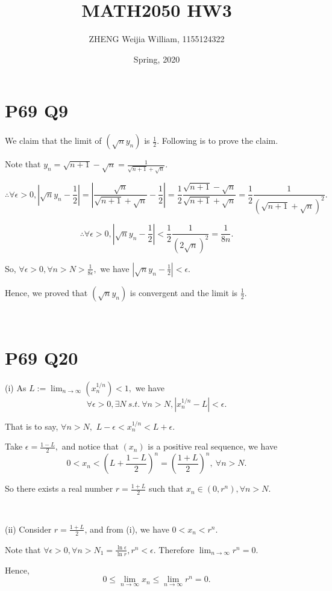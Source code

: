 \documentclass[12pt]{article}%
\begin{document}
\title{MATH2050 HW3}
\author{ZHENG Weijia William, 1155124322}
\date{Spring, 2020}
\maketitle

\section{P69 Q9}
We claim that the limit of $(\sqrt{n}y_n)$ is $\frac{1}{2}$. Following is to prove the claim. 

Note that $y_n=\sqrt{n+1}-\sqrt{n}=\frac{1}{\sqrt{n+1}+\sqrt{n}}.$

$$\therefore \forall \epsilon >0, |\sqrt{n}y_n-\frac{1}{2}|=|\frac{\sqrt{n}}{\sqrt{n+1}+\sqrt{n}}-\frac{1}{2}|=\frac{1}{2}\frac{\sqrt{n+1}-\sqrt{n}}{\sqrt{n+1}+\sqrt{n}}=\frac{1}{2}\frac{1}{(\sqrt{n+1}+\sqrt{n})^2}.$$

$$\therefore \forall \epsilon >0, |\sqrt{n}y_n-\frac{1}{2}|<\frac{1}{2}\frac{1}{(2\sqrt{n})^2}=\frac{1}{8n}.$$

So, $\forall \epsilon >0, \forall n>N>\frac{1}{8\epsilon},$ we have $|\sqrt{n}y_n-\frac{1}{2}|<\epsilon.$

Hence, we proved that $(\sqrt{n}y_n)$ is convergent and the limit is $\frac{1}{2}.$

~\

\section{P69 Q20}
(i) As $L:=\lim_{n \to \infty}(x_n^{1/n})<1,$ we have $$\forall \epsilon >0, \exists N~s.t.~\forall n>N, |x_n^{1/n}-L|<\epsilon.$$

That is to say, $\forall n>N,$ $L-\epsilon<x_n^{1/n}<L+\epsilon.$ 

Take $\epsilon = \frac{1-L}{2},$ and notice that $(x_n)$ is a positive real sequence, we have $$0<x_n<(L+\frac{1-L}{2})^n=(\frac{1+L}{2})^n,~\forall n>N.$$ 

So there exists a real number $r=\frac{1+L}{2}$ such that $x_n \in (0,r^n), \forall n>N.$

~\

(ii) Consider $r=\frac{1+L}{2}$, and from (i), we have $0<x_n<r^n.$

Note that $\forall \epsilon>0, \forall n > N_1 = \frac{\ln \epsilon}{\ln r}, r^n<\epsilon.$ Therefore $\lim_{n \to \infty}r^n = 0.$

Hence, $$0\leq \lim_{n \to \infty}x_n\leq \lim_{n \to \infty}r^n=0.$$ 
\end{document}
